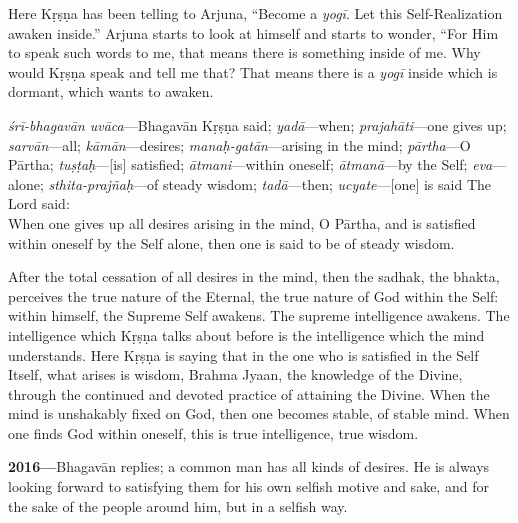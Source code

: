 Here Kṛṣṇa has been telling to Arjuna, “Become a \textit{yogī}. Let this Self-Realization awaken inside.” Arjuna starts to look at himself and starts to wonder, “For Him to speak such words to me, that means there is something inside of me. Why would Kṛṣṇa speak and tell me that? That means there is a \textit{yogī} inside which is dormant, which wants to awaken.

{%
  \textit{śrī-bhagavān uvāca}---Bhagavān Kṛṣṇa said; 
  \textit{yadā}---when; 
  \textit{prajahāti}---one gives up; 
  \textit{sarvān}---all; 
  \textit{kāmān}---desires; 
  \textit{manaḥ-gatān}---arising in the mind; 
  \textit{pārtha}---O Pārtha; 
  \textit{tuṣṭaḥ}---[is] satisfied; 
  \textit{ātmani}---within oneself; 
  \textit{ātmanā}---by the Self; 
  \textit{eva}---alone; 
  \textit{sthita-prajñaḥ}---of steady wisdom; 
  \textit{tadā}---then; 
  \textit{ucyate}---[one] is said
}
{%
  \hspace*{1em}The Lord said: \\
  When one gives up all desires arising in the mind, O Pārtha, and is satisfied within oneself by the Self alone, then one is said to be of steady wisdom.
}

After the total cessation of all desires in the mind, then the sadhak, the bhakta, perceives the true nature of the Eternal, the true nature of God within the Self: within himself, the Supreme Self awakens. The supreme intelligence awakens. The intelligence which Kṛṣṇa talks about before is the intelligence which the mind understands. Here Kṛṣṇa is saying that in the one who is satisfied in the Self Itself, what arises is wisdom, Brahma Jyaan, the knowledge of the Divine, through the continued and devoted practice of attaining the Divine. When the mind is unshakably fixed on God, then one becomes stable, of stable mind. When one finds God within oneself, this is true intelligence, true wisdom.

\textbf{2016---}Bhagavān replies; a common man has all kinds of desires. He is always looking forward to satisfying them for his own selfish motive and sake, and for the sake of the people around him, but in a selfish way.

